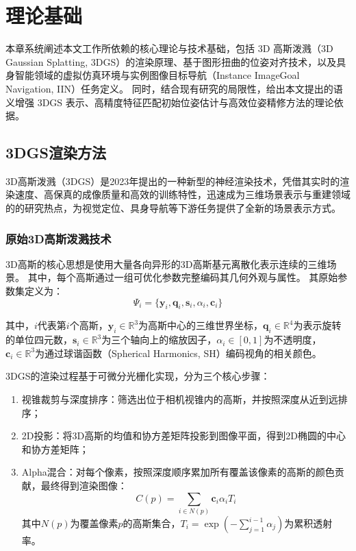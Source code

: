 \chapter{理论基础}
本章系统阐述本文工作所依赖的核心理论与技术基础，包括 3D 高斯泼溅（3D Gaussian Splatting, 3DGS）\cite{3DGS}的渲染原理、基于图形扭曲的位姿对齐技术，以及具身智能领域的虚拟仿真环境与实例图像目标导航（Instance ImageGoal Navigation, IIN）\cite{krantz2022instance}任务定义。
同时，结合现有研究的局限性，给出本文提出的语义增强 3DGS 表示、高精度特征匹配初始位姿估计与高效位姿精修方法的理论依据。

\section{3DGS渲染方法}
3D高斯泼溅（3DGS）\cite{3DGS}是2023年提出的一种新型的神经渲染技术，凭借其实时的渲染速度、高保真的成像质量和高效的训练特性，迅速成为三维场景表示与重建领域的的研究热点，为视觉定位、具身导航等下游任务提供了全新的场景表示方式。

\subsection{原始3D高斯泼溅技术}
3D高斯的核心思想是使用大量各向异形的3D高斯基元离散化表示连续的三维场景。
其中，每个高斯通过一组可优化参数完整编码其几何外观与属性。
其原始参数集定义为：
\begin{equation}
    \Psi_i = \{\boldsymbol{y}_i,\boldsymbol{q}_i,\boldsymbol{s}_i,\alpha_i,\boldsymbol{c}_i \}
\end{equation}

其中，$i$代表第$i$个高斯，$\boldsymbol{y}_i \in \mathbb{R}^{3}$为高斯中心的三维世界坐标，$\boldsymbol{q}_i \in \mathbb{R}^{4}$为表示旋转的单位四元数，$\boldsymbol{s}_i \in \mathbb{R}^{3}$为三个轴向上的缩放因子，$\alpha_i \in [0,1]$为不透明度，$\boldsymbol{c}_i \in \mathbb{R}^{3}$为通过球谐函数（Spherical Harmonics, SH）编码视角的相关颜色。


3DGS的渲染过程基于可微分光栅化实现，分为三个核心步骤：
\begin{enumerate}
    \item 视锥裁剪与深度排序：筛选出位于相机视锥内的高斯，并按照深度从近到远排序；
    \item 2D投影：将3D高斯的均值和协方差矩阵投影到图像平面，得到2D椭圆的中心和协方差矩阵；
    \item Alpha混合：对每个像素，按照深度顺序累加所有覆盖该像素的高斯的颜色贡献，最终得到渲染图像：
    \begin{equation}
        C(p) = \sum_{i \in N(p)} \boldsymbol{c}_i \alpha_i T_i
    \end{equation}
    其中$N(p)$为覆盖像素$p$的高斯集合，$T_i = \exp\left(-\sum_{j=1}^{i-1} \alpha_j\right)$为累积透射率。
\end{enumerate}


